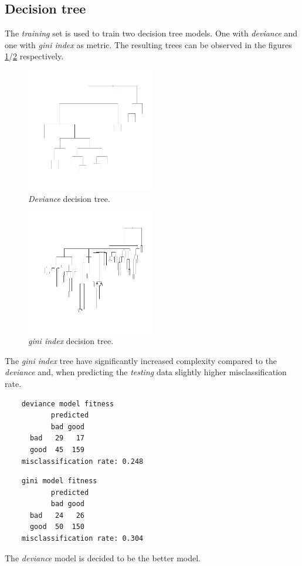 \documentclass[a4paper, twocolumn]{article}
\begin{document}
	\subsection{Decision tree}

	The \textit{training} set is used to train two decision tree models. One with \textit{deviance} and one with \textit{gini index} as metric. The resulting trees can be observed in the figures \ref{fig:deviance tree}/\ref{fig:gini tree} respectively.
	\begin{figure}
	    \centering
		\includegraphics[width=0.5\textwidth]{share/deviance_tree.png}  
		\caption{\textit{Deviance} decision tree.\label{fig:deviance tree}}
	\end{figure}
	\begin{figure}
	    \centering
		\includegraphics[width=0.5\textwidth]{share/gini_tree.png}  
		\caption{\textit{gini index} decision tree.\label{fig:gini tree}}
    \end{figure}
    The \textit{gini index} tree have significantly increased complexity compared to the \textit{deviance} and, when predicting the \textit{testing} data slightly higher misclassification rate.
	\begin{verbatim}
	deviance model fitness
	       predicted
	       bad good
	  bad   29   17
	  good  45  159
	misclassification rate: 0.248
	\end{verbatim}
	\begin{verbatim}
	gini model fitness
	       predicted
	       bad good
	  bad   24   26
	  good  50  150
	misclassification rate: 0.304
	\end{verbatim}
	The \textit{deviance} model is decided to be the better model.
\end{document}
